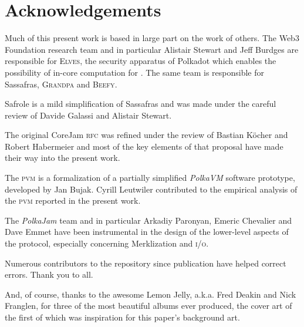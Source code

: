 \section{Acknowledgements}

Much of this present work is based in large part on the work of others. The Web3 Foundation research team and in particular Alistair Stewart and Jeff Burdges are responsible for \textsc{Elves}, the security apparatus of Polkadot which enables the possibility of in-core computation for \Jam. The same team is responsible for Sassafras, \textsc{Grandpa} and \textsc{Beefy}.

Safrole is a mild simplification of Sassafras and was made under the careful review of Davide Galassi and Alistair Stewart.

The original CoreJam \textsc{rfc} was refined under the review of Bastian Köcher and Robert Habermeier and most of the key elements of that proposal have made their way into the present work.

The \textsc{pvm} is a formalization of a partially simplified \emph{PolkaVM} software prototype, developed by Jan Bujak. Cyrill Leutwiler contributed to the empirical analysis of the \textsc{pvm} reported in the present work.

The \emph{PolkaJam} team and in particular Arkadiy Paronyan, Emeric Chevalier and Dave Emmet have been instrumental in the design of the lower-level aspects of the \Jam protocol, especially concerning Merklization and \textsc{i/o}.

Numerous contributors to the repository since publication have helped correct errors. Thank you to all.

And, of course, thanks to the awesome Lemon Jelly, a.k.a. Fred Deakin and Nick Franglen, for three of the most beautiful albums ever produced, the cover art of the first of which was inspiration for this paper's background art.